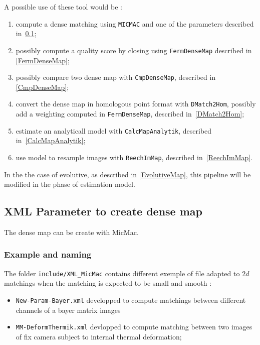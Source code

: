 A possible use of these tool would be :

\begin{enumerate}
   \item compute a dense matching using {\tt MICMAC} and one of the parameters described in~\ref{XMLDeneMatch};
   \item possibly compute a quality score by closing using {\tt FermDenseMap} described in \ref{FermDenseMap};
   \item possibly compare two dense map with {\tt CmpDenseMap}, described in \ref{CmpDenseMap};
   \item convert the dense map in homologous point format with {\tt DMatch2Hom}, 
         possibly add a weighting computed in {\tt FermDenseMap},
         described in~\ref{DMatch2Hom};
   \item estimate an analyticall model with {\tt CalcMapAnalytik}, described in~\ref{CalcMapAnalytik};
   \item use model to resample images with  {\tt ReechImMap}, described in~\ref{ReechImMap}.
\end{enumerate}

In the the case of evolutive, as described in  \ref{EvolutiveMap}, this pipeline will
be modified in the phase of estimation model.


\subsection{XML Parameter to create dense map}
\label{XMLDeneMatch}

The dense map can be create with MicMac.


\subsubsection{Example and naming}

\label{NameDM2}

The folder {\tt include/XML\_MicMac} contains different exemple of file
adapted to $2d$ matchings when the matching is expected to be small and smooth :

\begin{itemize}
   \item {\tt New-Param-Bayer.xml} developped to compute matchings between 
         different channels of a bayer matrix images

   \item {\tt MM-DeformThermik.xml} devlopped to compute matching between
         two images of fix camera subject to internal thermal deformation;
\end{itemize}

